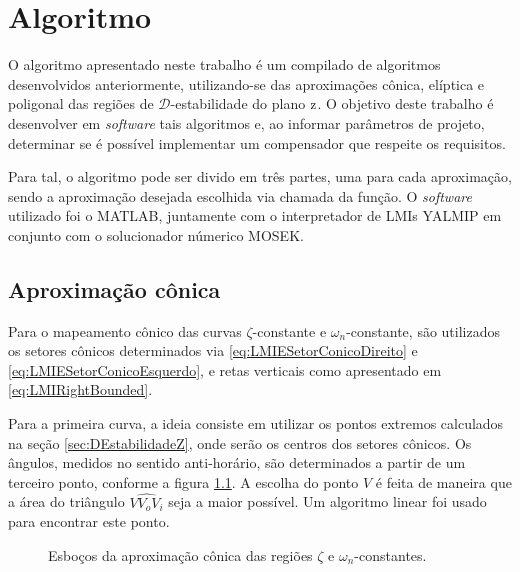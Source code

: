 \chapter{Algoritmo}

O algoritmo apresentado neste trabalho é um compilado de algoritmos desenvolvidos anteriormente, utilizando-se das aproximações cônica, elíptica e poligonal das regiões de $\mathscr{D}$-estabilidade do plano $\operatorname{\mathrm{z}}$. O objetivo deste trabalho é desenvolver em \emph{software} tais algoritmos e, ao informar parâmetros de projeto, determinar se é possível implementar um compensador que respeite os requisitos.

Para tal, o algoritmo pode ser divido em três partes, uma para cada aproximação, sendo a aproximação desejada escolhida via chamada da função. O \emph{software} utilizado foi o MATLAB, juntamente com o interpretador de LMIs YALMIP em conjunto com o solucionador númerico MOSEK. 

\section{Aproximação cônica}
Para o mapeamento cônico das curvas $\zeta$-constante e $\omega_n$-constante, são utilizados os setores cônicos determinados via \eqref{eq:LMIESetorConicoDireito} e \eqref{eq:LMIESetorConicoEsquerdo}, e retas verticais como apresentado em \ref{eq:LMIRightBounded}.

Para a primeira curva, a ideia consiste em utilizar os pontos extremos calculados na seção \ref{sec:DEstabilidadeZ}, onde serão os centros dos setores cônicos. Os ângulos, medidos no sentido anti-horário, são determinados a partir de um terceiro ponto, conforme a figura \ref{subfig:AproximacaoConicaZeta}. A escolha do ponto $V$ é feita de maneira que a área do triângulo $\widehat{VV_oV_i}$ seja a maior possível. Um algoritmo linear foi usado para encontrar este ponto.

\begin{figure}[!hb]
  \centering
  \begin{subfigure}[t]{0.4\columnwidth}
      
      \caption{}
      \label{subfig:AproximacaoConicaZeta}
  \end{subfigure}
  \begin{subfigure}[t]{0.4\columnwidth}
      
      \caption{}
      \label{subfig:AproximacaoConicaWn}
  \end{subfigure}
  \caption{Esboços da aproximação cônica das regiões $\zeta$ e $\omega_n$-constantes.}
  \label{fig:AproximacoesConica}
\end{figure}

